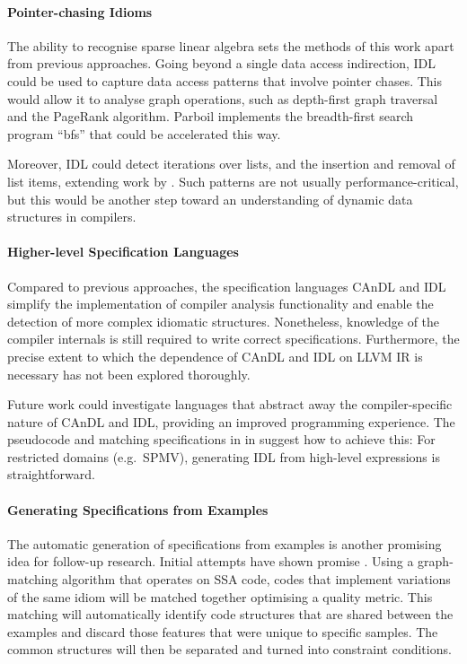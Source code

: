 \paragraph*{Pointer-chasing Idioms}

    The ability to recognise sparse linear algebra sets the methods of this
    work apart from previous approaches.
    Going beyond a single data access indirection, IDL could be used to capture
    data access patterns that involve pointer chases.
    This would allow it to analyse graph operations, such as depth-first graph
    traversal and the PageRank algorithm.
    Parboil implements the breadth-first search program ``bfs'' that could be
    accelerated this way.

    Moreover, IDL could detect iterations over lists, and the insertion and
    removal of list items, extending work by
    \citet{Manilov:2018:GPI:3178372.3179511}.
    Such patterns are not usually performance-critical, but this would be
    another step toward an understanding of dynamic data structures in compilers.

    \paragraph*{Higher-level Specification Languages}
    Compared to previous approaches, the specification languages CAnDL and IDL
    simplify the implementation of compiler analysis functionality and enable
    the detection of more complex idiomatic structures.
    Nonetheless, knowledge of the compiler internals is still required to write
    correct specifications.
    Furthermore, the precise extent to which the dependence of CAnDL and IDL on
    LLVM IR is necessary has not been explored thoroughly.

    Future work could investigate languages that abstract away the
    compiler-specific nature of CAnDL and IDL, providing an improved programming
    experience.
    The pseudocode and matching specifications in
     in  suggest
    how to achieve this:
    For restricted domains (e.g.\ SPMV), generating IDL from high-level
    expressions is straightforward.

    \paragraph*{Generating Specifications from Examples}
    The automatic generation of specifications from examples is another
    promising idea for follow-up research.
    Initial attempts have shown promise \citep{DBLP:conf/IEEEpact/CollieGO19}.
    Using a graph-matching algorithm that operates on SSA code, codes that
    implement variations of the same idiom will be matched together optimising
    a quality metric.
    This matching will automatically identify code structures that are shared
    between the examples and discard those features that were unique to
    specific samples.
    The common structures will then be separated and turned into constraint
    conditions.

